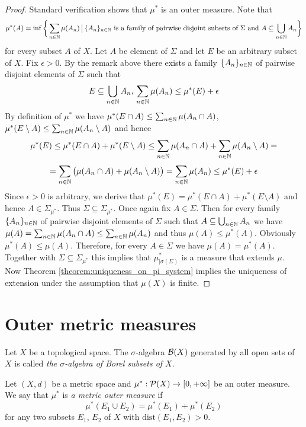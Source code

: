 \begin{proof}
Standard verification shows that $\mu^*$ is an outer measure. Note that 
$$\mu^*(A) = \inf \bigg\{\sum_{n\in {\mathbb N}}\mu(A_n)\,\big|\,\{A_n\}_{n\in {\mathbb N}}\mbox{ is a family of pairwise disjoint subsets of }\Sigma \mbox{ and }A\subseteq \bigcup_{n\in {\mathbb N}}A_n\bigg\}$$
for every subset $A$ of $X$. Let $A$ be element of $\Sigma$ and let $E$ be an arbitrary subset of $X$. Fix $\epsilon > 0$. By the remark above there exists a family $\{A_n\}_{n\in {\mathbb N}}$ of pairwise disjoint elements of $\Sigma$ such that
$$E\subseteq \bigcup_{n\in {\mathbb N}}A_n,\,\sum_{n\in {\mathbb N}}\mu(A_n)\leq \mu^*(E)+\epsilon$$
By definition of $\mu^*$ we have $\mu^*(E\cap A)\leq \sum_{n\in {\mathbb N}}\mu(A_n\cap A)$, $\mu^*(E\setminus A) \leq \sum_{n\in {\mathbb N}}\mu(A_n\setminus A)$ and hence
$$\mu^*(E)\leq \mu^*(E\cap A)+\mu^*(E\setminus A) \leq \sum_{n\in {\mathbb N}}\mu(A_n\cap A)+\sum_{n\in {\mathbb N}}\mu(A_n\setminus A)=$$
$$=\sum_{n\in {\mathbb N}}\big(\mu(A_n\cap A)+\mu(A_n\setminus A)\big)=\sum_{n\in {\mathbb N}}\mu(A_n)\leq \mu^*(E)+\epsilon$$
Since $\epsilon > 0$ is arbitrary, we derive that $\mu^*(E) = \mu^*(E\cap A)+\mu^*(E\setminus A)$ and hence $A\in \Sigma_{\mu^*}$. Thus $\Sigma \subseteq \Sigma_{\mu^*}$. Once again fix $A\in \Sigma$. Then for every family $\{A_n\}_{n\in {\mathbb N}}$ of pairwise disjoint elements of $\Sigma$ such that $A\subseteq \bigcup_{n\in {\mathbb N}}A_n$ we have $\mu(A) = \sum_{n\in {\mathbb N}}\mu(A_n\cap A)\leq \sum_{n\in {\mathbb N}}\mu(A_n)$ and thus $\mu(A)\leq \mu^*(A)$. Obviously $\mu^*(A)\leq \mu(A)$. Therefore, for every $A\in \Sigma$ we have $\mu(A) = \mu^*(A)$. Together with $\Sigma\subseteq \Sigma_{\mu^*}$ this implies that $\mu^*_{\mid \sigma(\Sigma)}$ is a measure that extends $\mu$. Now Theorem \ref{theorem:uniqueness_on_pi_system} implies the uniqueness of extension under the assumption that $\mu(X)$ is finite.
\end{proof}

\section{Outer metric measures}

\begin{definition}
Let $X$ be a topological space. The $\sigma$-algebra ${\mathcal B}(X)$ generated by all open sets of $X$ is called \textit{the $\sigma$-algebra of Borel subsets of $X$}.
\end{definition}

\begin{definition}
Let $(X,d)$ be a metric space and $\mu^*:{\mathcal P}(X)\rightarrow [0,+\infty]$ be an outer measure. We say that $\mu^*$ is \textit{a metric outer measure} if  
$$\mu^*(E_1\cup E_2)=\mu^*(E_1)+\mu^*(E_2)$$
for any two subsets $E_1$, $E_2$ of $X$ with $\mathrm{dist}(E_1,E_2) > 0$.
\end{definition}

